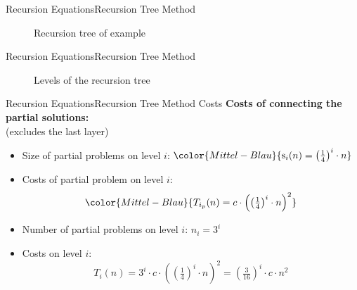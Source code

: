 
\begin{frame}{Recursion Equations}{Recursion Tree Method}
  \begin{figure}
    \begin{adjustbox}{width=\linewidth}
      
    \end{adjustbox}
    \caption{Recursion tree of example}
    \label{fig:recursion_equations:example_recursion_tree}
  \end{figure}
\end{frame}


\begin{frame}{Recursion Equations}{Recursion Tree Method}
  \begin{figure}
    \begin{adjustbox}{width=\linewidth}
      
    \end{adjustbox}
    \caption{Levels of the recursion tree}
    \label{fig:recursion_equations:example_recursion_tree_layer}
  \end{figure}
\end{frame}

\begin{frame}{Recursion Equations}{Recursion Tree Method Costs}
  \textbf{Costs of connecting the partial solutions:}\\
  \hspace{1.5em}(excludes the last layer)
  \begin{itemize}
    \item<2->
      Size of partial problems on {\color{Mittel-Blau}level $i$}:
      \begin{math}
        \color{Mittel-Blau}{
          \mathrm{s}_i(n) = \left(\frac{1}{4}\right)^i \cdot n
        }
      \end{math}
    \item<3->
      Costs of partial problem on {\color{Mittel-Blau}level $i$}:
      \begin{displaymath}
        \color{Mittel-Blau}{
          T_{i_p}(n) =
          c \cdot \left(\left(\tfrac{1}{4}\right)^i \cdot n\right)^2
        }
      \end{displaymath}
    \item<4->
      Number of partial problems on {\color{Mittel-Blau}level $i$}:
      {\color{Mittel-Blau}$n_{i} = 3^{i}$}
    \item<5->
      Costs on {\color{Mittel-Blau}level $i$}:
        \color{Mittel-Blau}
      \begin{displaymath}
        T_i(n) = 3^{i} \cdot c \cdot \left(
          \left(\tfrac{1}{4}\right)^{i} \cdot n
        \right)^2
        = \left(\tfrac{3}{16}\right)^{i} \cdot c \cdot n^2
      \end{displaymath}
        \color{black}
  \end{itemize}
\end{frame}

